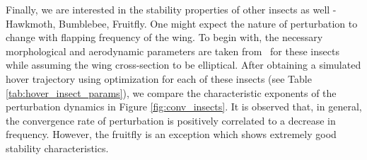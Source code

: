 \documentclass[10pt]{article}
\begin{document}
Finally, we are interested in the stability properties of other insects as well - Hawkmoth, Bumblebee, Fruitfly. One might expect the nature of perturbation to change with flapping frequency of the wing. To begin with, the necessary morphological and aerodynamic parameters are taken from~\cite{berman2007energy} for these insects while assuming the wing cross-section to be elliptical. After obtaining a simulated hover trajectory using optimization for each of these insects (see Table \ref{tab:hover_insect_params}), we compare the characteristic exponents of the perturbation dynamics in Figure \ref{fig:conv_insects}. It is observed that, in general, the convergence rate of perturbation is positively correlated to a decrease in frequency. However, the fruitfly is an exception which shows extremely good stability characteristics.
%
\end{document}
